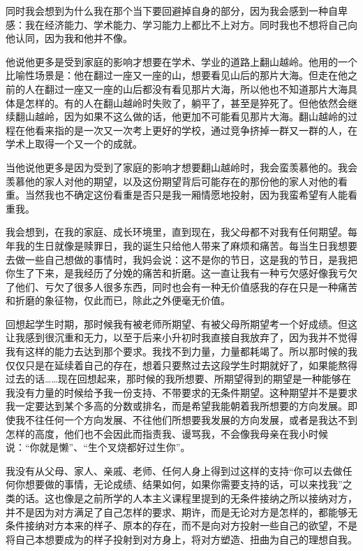 同时我会想到为什么我在那个当下要回避掉自身的部分，因为我会感到一种自卑感：我在经济能力、学术能力、学习能力上都比不上对方。同时我也不想将自己向他认同，因为我和他并不像。

他说他更多是受到家庭的影响才想要在学术、学业的道路上翻山越岭。他用的一个比喻性场景是：他在翻过一座又一座的山，想要看见山后的那片大海。但走在他之前的人在翻过一座又一座的山后都没有看见那片大海，所以他也不知道那片大海具体是怎样的。有的人在翻山越岭时失败了，躺平了，甚至是猝死了。但他依然会继续翻山越岭，因为如果不这么做的话，他更加不可能看见那片大海。翻山越岭的过程在他看来指的是一次又一次考上更好的学校，通过竞争挤掉一群又一群的人，在学术上取得一个又一个的成就。

当他说他更多是因为受到了家庭的影响才想要翻山越岭时，我会蛮羡慕他的。我会羡慕他的家人对他的期望，以及这份期望背后可能存在的那份他的家人对他的看重。当然我也不确定这份看重是否只是我一厢情愿地投射，因为我蛮希望有人能看重我。

我会想到，在我的家庭、成长环境里，直到现在，我父母都不对我有任何期望。每年我的生日就像是赎罪日，我的诞生只给他人带来了麻烦和痛苦。每当生日我想要去做一些自己想做的事情时，我妈会说：这不是你的节日，这是我的节日，是我把你生了下来，是我经历了分娩的痛苦和折磨。这一直让我有一种亏欠感\pozhehao{}好像我亏欠了他们、亏欠了很多人很多东西，同时也会有一种无价值感\pozhehao{}我的存在只是一种痛苦和折磨的象征物，仅此而已，除此之外便毫无价值。

回想起学生时期，那时候我有被老师所期望、有被父母所期望考一个好成绩。但这让我感到很沉重和无力，以至于后来小升初时我直接自我放弃了，因为我并不觉得我有这样的能力去达到那个要求。我找不到力量，力量都耗竭了。所以那时候的我仅仅只是在延续着自己的存在，想着只要熬过去这段学生时期就好了，如果能熬得过去的话……现在回想起来，那时候的我所想要、所期望得到的期望是一种能够在我没有力量的时候给予我一份支持、不带要求的无条件期望。这种期望并不是要求我一定要达到某个多高的分数或排名，而是希望我能朝着我所想要的方向发展。即使我不往任何一个方向发展、不往他们所想要我发展的方向发展，或者是我达不到怎样的高度，他们也不会因此而指责我、谩骂我，不会像我母亲在我小时候说：“你就是懒”、“生个叉烧都好过生你”。

我没有从父母、家人、亲戚、老师、任何人身上得到过这样的支持\pozhehao{}“你可以去做任何你想要做的事情，无论成绩、结果如何，如果你需要支持的话，可以来找我”之类的话。这也像是之前所学的人本主义课程里提到的无条件接纳\pozhehao{}之所以接纳对方，并不是因为对方满足了自己怎样的要求、期许，而是无论对方是怎样的，都能够无条件接纳对方本来的样子、原本的存在，而不是向对方投射一些自己的欲望，不是将自己本想要成为的样子投射到对方身上，将对方塑造、扭曲为自己的理想自我。

